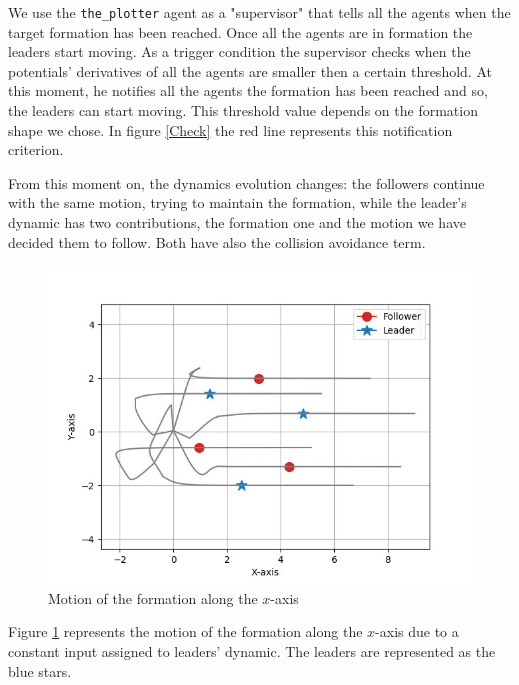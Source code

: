 \documentclass[a4paper,11pt,oneside]{book}
\begin{document}
\bigskip
We use the \texttt{the\_plotter} agent as a "supervisor" that tells all the agents when the target formation has been reached. Once all the agents are in formation the leaders start moving. As a trigger condition the supervisor checks when the potentials' derivatives of all the agents are smaller then a certain threshold. At this moment, he notifies all the agents the formation has been reached and so, the leaders can start moving. This threshold value depends on the formation shape we chose. In figure \ref{Check} the red line represents this notification criterion.

\bigskip
From this moment on, the dynamics evolution changes: the followers continue with the same motion, trying to maintain the formation, while the leader's dynamic has two contributions, the formation one and the motion we have decided them to follow. Both have also the collision avoidance term.

\begin{figure}[h]
\centering
	\includegraphics[scale=0.4]{Moving_hexagon_formation_linear.jpg}
	\caption{Motion of the formation along the $x$-axis}
	\label{Formation_motion_lin}
\end{figure}

Figure \ref{Formation_motion_lin} represents the motion of the formation along the $x$-axis due to a constant input assigned to leaders' dynamic. The leaders are represented as the blue stars.
\end{document}
